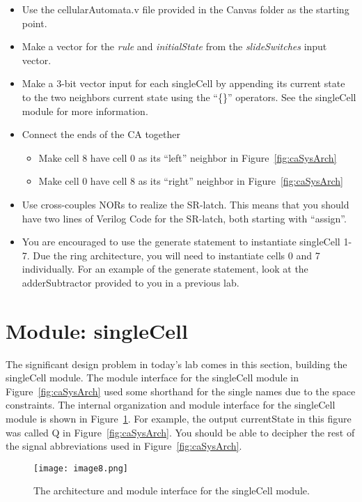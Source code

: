 \begin{itemize}
\item
  Use the cellularAutomata.v file provided in the Canvas folder as the
  starting point.
\item
  Make a vector for the \emph{rule} and \emph{initialState} from the
  \emph{slideSwitches} input vector.
\item
  Make a 3-bit vector input for each singleCell by appending its current
  state to the two neighbors current state using the ``\{\}'' operators.
  See the singleCell module for more information.
\item
  Connect the ends of the CA together

  \begin{itemize}
  \item
    Make cell 8 have cell 0 as its ``left'' neighbor in Figure~\ref{fig:caSysArch}
  \item
    Make cell 0 have cell 8 as its ``right'' neighbor in Figure~\ref{fig:caSysArch}
  \end{itemize}
\item
  Use cross-couples NORs to realize the SR-latch. This means that you
  should have two lines of Verilog Code for the SR-latch, both starting
  with ``assign''.
\item
  You are encouraged to use the generate statement to instantiate
  singleCell 1-7. Due the ring architecture, you will need to
  instantiate cells 0 and 7 individually. For an example of the generate
  statement, look at the adderSubtractor provided to you in a previous
  lab.
\end{itemize}


\section{Module: singleCell}

The significant design problem in today's lab comes in this section,
building the singleCell module. The module interface for the singleCell
module in Figure~\ref{fig:caSysArch} used some shorthand for the single names due to the
space constraints. The internal organization and module interface for
the singleCell module is shown in Figure~\ref{fig:caSingleCell}. For example, the output
currentState in this figure was called Q in Figure~\ref{fig:caSysArch}. You should be able
to decipher the rest of the signal abbreviations used in Figure~\ref{fig:caSysArch}.

\begin{figure}[ht]
\texttt{[image: image8.png]}
\caption{The architecture and module interface for the singleCell module.}
\label{fig:caSingleCell}
\end{figure}


